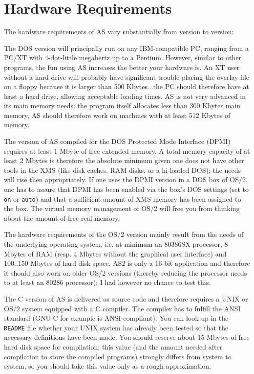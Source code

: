 \documentclass[12pt,twoside]{report}
\newcommand{\tty}[1]{{\tt #1}}
\begin{document}

\section{Hardware Requirements}

The hardware requirements of AS vary substantially from version to
version:

The DOS version  will principally run on any
IBM-compatible PC, ranging from a PC/XT with 4-dot-little megahertz up to
a Pentium.  However, similar to other programs, the fun using AS increases
the better your hardware is.  An XT user without a hard drive will
probably have significant trouble placing the overlay file on a floppy
because it is larger than 500 Kbytes...the PC should therefore have at
least a hard drive, allowing acceptable loading times.  AS is not very
advanced in its main memory needs: the program itself allocates less than
300 Kbytes main memory, AS should therefore work on machines with at least
512 Kbytes of memory.

The version of AS  compiled for the DOS Protected
Mode Interface (DPMI) requires at least 1 Mbyte of free extended memory.
A total memory capacity of at least 2 Mbytes is therefore the absolute
minimum given one does not have other tools in the XMS (like disk caches,
RAM disks, or a hi-loaded DOS); the needs will rise then appropriately.
If one uses the DPMI version in a DOS box of OS/2, one has to assure that
DPMI has been enabled via the box's DOS settings (set to \tty{on} or
\tty{auto}) and that a sufficient amount of XMS memory has been assigned
to the box.  The virtual memory management of OS/2 will free you
from thinking about the amount of free real memory.

The hardware requirements of the OS/2  version
mainly result from the needs of the underlying operating system, i.e. at
minimum an 80386SX processor, 8 Mbytes of RAM (resp. 4 Mbytes without the
graphical user interface) and 100..150 Mbytes of hard disk space.  AS2 is
only a 16-bit application and therefore it should also work on older OS/2
versions (thereby reducing the processor needs to at least an 80286
processor); I had however no chance to test this.

The C version of AS  is delivered as source code and
therefore requires a UNIX or OS/2 system equipped with a C compiler.  The
compiler has to fulfill the ANSI standard (GNU-C for example is
ANSI-compliant).  You can look up in the \tty{README} file whether your
UNIX system has already been tested so that the necessary definitions have
been made.  You should reserve about 15 Mbytes of free hard disk space for
compilation; this value (and the amount needed after compilation to store
the compiled programs) strongly differs from system to system, so you
should take this value only as a rough approximation.
\end{document}
